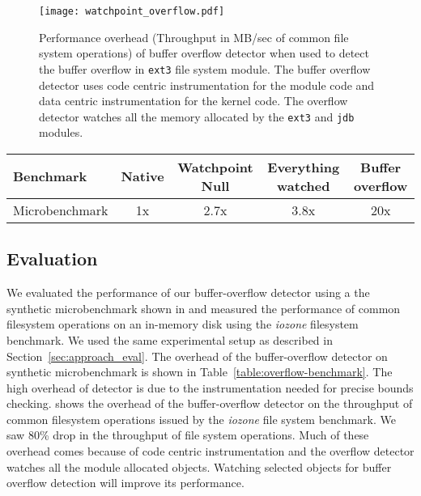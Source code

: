 \begin{figure}[t]
\begin{center}
\texttt{[image: watchpoint\_overflow.pdf]}
\end{center}
\caption[Performance impact of buffer overflow detector.]{\label{fig:watchpoint_overflow}Performance overhead (Throughput in MB/sec of common file system operations) of buffer overflow detector when used to detect the buffer overflow in \texttt{ext3} file system module. The buffer overflow detector uses code centric instrumentation for the module code and data centric instrumentation for the kernel code. The overflow detector watches all the memory allocated by the \texttt{ext3} and \texttt{jdb} modules.}
\end{figure}


\begin{table*}
\begin{center}
\begin{tabular}{|l|c c c c|}
  \hline
  Benchmark & Native & Watchpoint Null & Everything watched & Buffer overflow\\
  \hline
  Microbenchmark  & 1x & 2.7x & 3.8x & 20x\\
  \hline
\end{tabular}
\caption[Performance impact of buffer overflow detector on microbenchmark]{\label{table:overflow-benchmark}The overhead of watchpoint instrumentation for buffer overflow detector on microbenchmark shown in . The buffer overflow detector uses instrumentation for bounds checking on the access of watched objects.}
\end{center}
\end{table*}


\subsection{Evaluation}
We evaluated the performance of our buffer-overflow detector using a the synthetic microbenchmark shown in  and measured the performance of common filesystem operations on an in-memory disk using the \emph{iozone} filesystem benchmark. We used the same experimental setup as described in Section~\ref{sec:approach_eval}. The overhead of the buffer-overflow detector on synthetic microbenchmark is shown in Table~\ref{table:overflow-benchmark}. The high overhead of detector is due to the instrumentation needed for precise bounds checking.  shows the overhead of the buffer-overflow detector on the throughput of common filesystem operations issued by the \emph{iozone} file system benchmark. We saw {\texttildelow}80\% drop in the throughput of file system operations. Much of these overhead comes because of code centric instrumentation and the overflow detector watches all the module allocated objects. Watching selected objects for buffer overflow detection will improve its performance.




